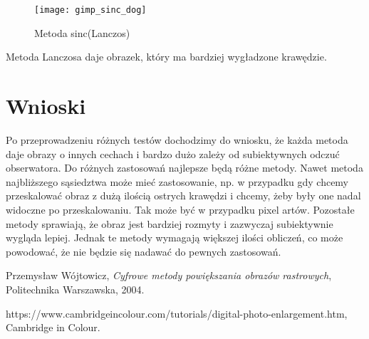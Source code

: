 \documentclass{mwart}
\theoremstyle{definition}
\begin{document}
\begin{figure}[!h]
	\texttt{[image: gimp\_sinc\_dog]}
	\caption*{Metoda sinc(Lanczos)}
\end{figure}

Metoda Lanczosa daje obrazek, który ma bardziej wygładzone krawędzie.
\clearpage
\section{Wnioski}
Po przeprowadzeniu różnych testów dochodzimy do wniosku, że każda metoda daje obrazy o innych cechach i bardzo dużo zależy od subiektywnych odczuć obserwatora. Do różnych zastosowań najlepsze będą różne metody. Nawet metoda najbliższego sąsiedztwa może mieć zastosowanie, np. w przypadku gdy chcemy przeskalować obraz z dużą ilością ostrych krawędzi i chcemy, żeby były one nadal widoczne po przeskalowaniu. Tak może być w przypadku pixel artów. Pozostałe metody sprawiają, że obraz jest bardziej rozmyty i zazwyczaj subiektywnie wygląda lepiej. Jednak te metody wymagają większej ilości obliczeń, co może powodować, że nie będzie się nadawać do pewnych zastosowań.
\begin{thebibliography}{9}

  Przemysław Wójtowicz,
  \textit{Cyfrowe metody powiększania obrazów rastrowych},
  Politechnika Warszawska,
  2004.

  https://www.cambridgeincolour.com/tutorials/digital-photo-enlargement.htm,
Cambridge in Colour.

\end{thebibliography}
\end{document}
